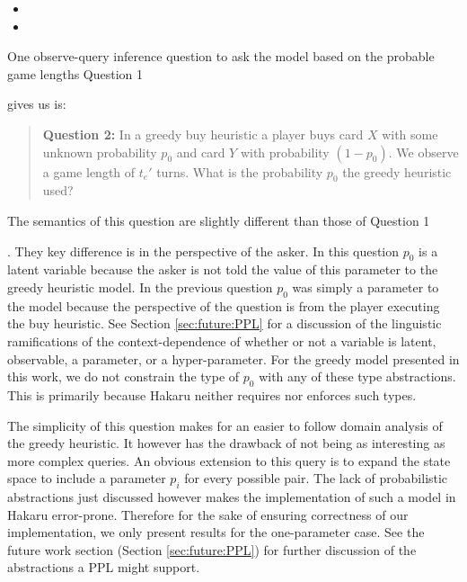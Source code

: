 \begin{itemize}
\item {}
\item {}
\end{itemize}

One observe-query inference question to ask the model based on the
probable game lengths Question 1 \ignore{\ref{quote:dominion-query}} gives us is:

\begin{quote} %
  {\bf Question 2: }
  In a greedy buy heuristic a player buys card $X$ with some unknown probability $p_0$
  and card $Y$ with probability $(1 - p_0)$. We observe a game length of $t_e'$
  turns. What is the probability $p_0$ the greedy heuristic used?
\end{quote}

The semantics of this question are slightly different than those of
Question 1 \ignore{\ref{quote:dominion-query}}. They key difference is in the
perspective of the asker. In this question $p_0$ is a latent variable
because the asker is not told the value of this parameter to the greedy
heuristic model. In the previous question $p_0$ was simply a parameter
to the model because the perspective of the question is from the player
executing the buy heuristic. See Section \ref{sec:future:PPL} for a
discussion of the linguistic ramifications of the context-dependence
of whether or not a variable is latent, observable, a parameter, or a
hyper-parameter. For the greedy model presented in this work, we do
not constrain the type of $p_0$ with any of these type abstractions.
This is primarily because Hakaru neither requires nor enforces such types.

The simplicity of this question makes for an easier to follow domain
analysis of the greedy heuristic. It however has the drawback of not being as
interesting as more complex queries. An obvious extension to this query
is to expand the state space to include a parameter $p_i$ for every possible
 pair. The lack of probabilistic abstractions
just discussed however makes the implementation of such a model in Hakaru
error-prone. Therefore for the sake of ensuring correctness of our implementation,
we only present results for the one-parameter case. See the future work
section (Section \ref{sec:future:PPL}) for further discussion of the
abstractions a PPL might support.

